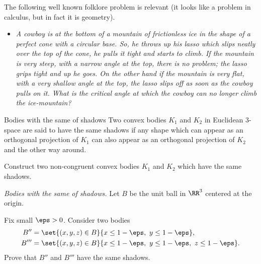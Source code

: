 






The following well known folklore problem is relevant
(it looks like a problem in calculus, but in fact it is geometry).

\begin{itemize}
\item \textit{ 
A cowboy is at the bottom of a mountain of frictionless ice in the shape of a perfect cone with a circular base. 
So, he throws up his lasso which slips neatly over the top of the cone, he pulls it tight and starts to climb. If the mountain is very steep, with a narrow angle at the top, there is no problem; the lasso grips tight and up he goes. On the other hand if the mountain is very flat, with a very shallow angle at the top, the lasso slips off as soon as the cowboy pulls on it. 
What is the critical angle at which the cowboy can no longer climb the ice-mountain?}
\end{itemize}


\begin{pr}{\easy}{Bodies with the same of shadows}\label{Bodies with the same of shadows}
Two convex bodies $K_1$ and $K_2$ in Euclidean 3-space are said to have the same shadows if any shape which can appear as an orthogonal projection of $K_1$ can also appear as an orthogonal projection of $K_2$ and the other way around.

Construct two non-congruent convex bodies $K_1$ and $K_2$ which have the same shadows.
\end{pr}

\textit{Bodies with the same of shadows.}
Let $B$ be the unit ball in $\RR^3$ centered at the origin.

Fix small $\eps>0$.
Consider two bodies 
\begin{align*}
B''&=\set{(x,y,z)\in B}{x\le 1-\eps,\  y\le 1-\eps},
\\ 
B'''&=\set{(x,y,z)\in B}{x\le 1-\eps,\  y\le 1-\eps,\  z\le 1-\eps}.
\end{align*}
Prove that $B''$ and $B'''$ have the same shadows.

